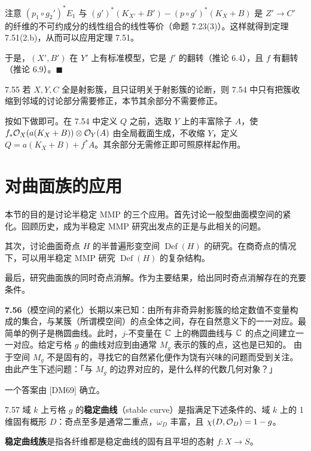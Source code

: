 注意 $(p_1\circ g_2')^*E_1$ 与 $(g')^*(K_{X'}+B')-(p\circ g')^*(K_X+B)$ 是 $Z'\to C'$ 的纤维的不可约成分的线性组合的线性等价（命题 7.23(3)）。这样就得到定理 7.51(2.b)，从而可以应用定理 7.51。

于是，$(X',B')$ 在 $Y'$ 上有标准模型，它是 $f'$ 的翻转（推论 6.4），且 $f$ 有翻转（推论 6.9）。\hfill$\blacksquare$

\begin{remark}{7.55}
若 $X,Y,C$ 全是射影簇，且只证明关于射影簇的论断，则 7.54 中只有把簇收缩到邻域的讨论部分需要修正，本节其余部分不需要修正。

按如下做即可。在 7.54 中定义 $Q$ 之前，选取 $Y$ 上的丰富除子 $A$，使 $f_*\mathcal{O}_X(a(K_X+B))\otimes\mathcal{O}_Y(A)$ 由全局截面生成，不收缩 $Y$，定义 $Q=a(K_X+B)+f^*A$。其余部分无需修正即可照原样起作用。
\end{remark}

\section{对曲面族的应用}

本节的目的是讨论半稳定 MMP 的三个应用。首先讨论一般型曲面模空间的紧化。回顾历史，成为半稳定 MMP 研究出发点的正是与此相关的问题。

其次，讨论曲面奇点 $H$ 的半普遍形变空间 $\operatorname{Def}(H)$ 的研究。在商奇点的情况下，可以用半稳定 MMP 研究 $\operatorname{Def}(H)$ 的复杂结构。

最后，研究曲面族的同时奇点消解。作为主要结果，给出同时奇点消解存在的充要条件。

\par\medskip\noindent\textbf{7.56}（模空间的紧化）\quad 长期以来已知：由所有非奇异射影簇的给定数值不变量构成的集合，与某簇（所谓模空间）的点全体之间，存在自然意义下的一一对应。最简单的例子是椭圆曲线。此时，$j$-不变量在 $\mathbb{C}$ 上的椭圆曲线与 $\mathbb{C}$ 的点之间建立一一对应。给定亏格 $g$ 的曲线对应到由通常 $M_g$ 表示的簇的点，这也是已知的。
由于空间 $M_g$ 不是固有的，寻找它的自然紧化便作为饶有兴味的问题而受到关注。由此产生下述问题：「与 $M_g$ 的边界对应的，是什么样的代数几何对象？」

一个答案由 [DM69] 确立。

\begin{definition}{7.57}
域 $k$ 上亏格 $g$ 的\textbf{稳定曲线}（stable curve）是指满足下述条件的、域 $k$ 上的 1 维固有概形 $D$：奇点至多是通常二重点，$\omega_D$ 丰富，且 $\chi(D,\mathcal{O}_D)=1-g$。

\textbf{稳定曲线族}是指各纤维都是稳定曲线的固有且平坦的态射 $f\colon X\to S$。
\end{definition}

